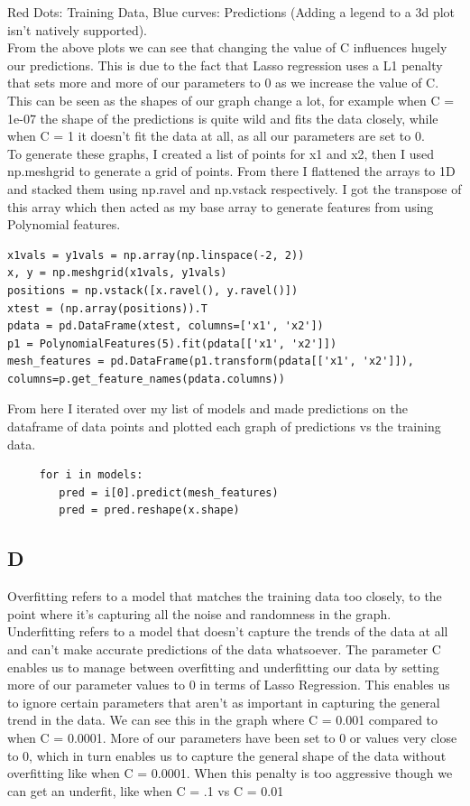\documentclass[11pt]{article} %
\begin{document}
 Red Dots: Training Data, Blue curves: Predictions (Adding a legend to a 3d plot isn't natively supported).\\
 From the above plots we can see that changing the value of C influences hugely our predictions. This is due to the fact that Lasso regression uses a L1 penalty that sets more and more of our parameters to 0 as we increase the value of C. This can be seen as the shapes of our graph change a lot, for example when C = 1e-07 the shape of the predictions is quite wild and fits the data closely, while when C = 1 it doesn't fit the data at all, as all our parameters are set to 0.
 \\
 To generate these graphs, I created a list of points for x1 and x2, then I used np.meshgrid to generate a grid of points. From there I flattened the arrays to 1D and stacked them using np.ravel and np.vstack respectively. I got the transpose of this array which then acted as my base array to generate features from using Polynomial features.
 \begin{verbatim}
x1vals = y1vals = np.array(np.linspace(-2, 2))
x, y = np.meshgrid(x1vals, y1vals)
positions = np.vstack([x.ravel(), y.ravel()])
xtest = (np.array(positions)).T
pdata = pd.DataFrame(xtest, columns=['x1', 'x2'])
p1 = PolynomialFeatures(5).fit(pdata[['x1', 'x2']])
mesh_features = pd.DataFrame(p1.transform(pdata[['x1', 'x2']]), columns=p.get_feature_names(pdata.columns))
 \end{verbatim}
 From here I iterated over my list of models and made predictions on the dataframe of data points and plotted each graph of predictions vs the training data.
 \begin{verbatim}
     for i in models:
        pred = i[0].predict(mesh_features)
        pred = pred.reshape(x.shape)
 \end{verbatim}
 \subsection{D}
 Overfitting refers to a model that matches the training data too closely, to the point where it's capturing all the noise and randomness in the graph. Underfitting refers to a model that doesn't capture the trends of the data at all and can't make accurate predictions of the data whatsoever. The parameter C enables us to manage between overfitting and underfitting our data by setting more of our parameter values to 0 in terms of Lasso Regression. This enables us to ignore certain parameters that aren't as important in capturing the general trend in the data. We can see this in the graph where C = 0.001 compared to when C = 0.0001. More of our parameters have been set to 0 or values very close to 0, which in turn enables us to capture the general shape of the data without overfitting like when C = 0.0001. When this penalty is too aggressive though we can get an underfit, like when C = .1 vs C = 0.01
\end{document}
